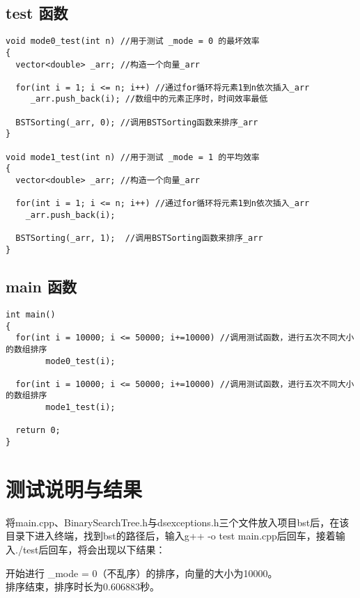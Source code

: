 \documentclass[UTF8]{ctexart}
\begin{document}
\newpage

\subsection{test 函数}

\begin{lstlisting}[language={[ANSI]C++}]
void mode0_test(int n) //用于测试 _mode = 0 的最坏效率
{
  vector<double> _arr; //构造一个向量_arr
  
  for(int i = 1; i <= n; i++) //通过for循环将元素1到n依次插入_arr
     _arr.push_back(i); //数组中的元素正序时，时间效率最低
     
  BSTSorting(_arr, 0); //调用BSTSorting函数来排序_arr
}

void mode1_test(int n) //用于测试 _mode = 1 的平均效率
{
  vector<double> _arr; //构造一个向量_arr
  
  for(int i = 1; i <= n; i++) //通过for循环将元素1到n依次插入_arr
    _arr.push_back(i);

  BSTSorting(_arr, 1);  //调用BSTSorting函数来排序_arr
}
\end{lstlisting}

\subsection{main 函数}

\begin{lstlisting}[language={[ANSI]C++}]
int main()
{
  for(int i = 10000; i <= 50000; i+=10000) //调用测试函数，进行五次不同大小的数组排序
        mode0_test(i);
        
  for(int i = 10000; i <= 50000; i+=10000) //调用测试函数，进行五次不同大小的数组排序
        mode1_test(i);

  return 0;
}
\end{lstlisting}

\newpage

\section{测试说明与结果}

将main.cpp、BinarySearchTree.h与dsexceptions.h三个文件放入项目bst后，在该目录下进入终端，找到bst的路径后，输入g++ -o test main.cpp后回车，接着输入./test后回车，将会出现以下结果：


开始进行 \_mode = 0（不乱序）的排序，向量的大小为10000。\\
排序结束，排序时长为0.606883秒。\\
\end{document}
